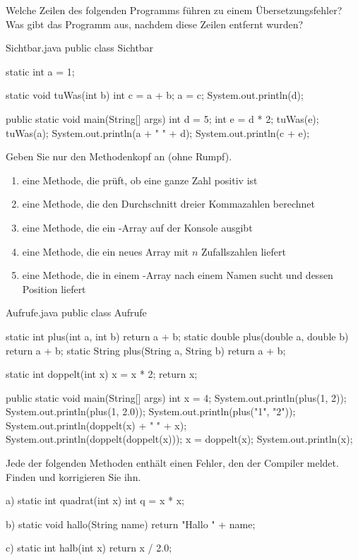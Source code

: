 Welche Zeilen des folgenden Programms führen zu einem Übersetzungsfehler? Was gibt das Programm aus, nachdem diese Zeilen entfernt wurden?
\begin{javacode}{Sichtbar.java}
public class Sichtbar {
	static int a = 1;

	static void tuWas(int b) {
		int c = a + b;
		a = c;
		System.out.println(d);
	}

	public static void main(String[] args) {
		int d = 5;
		{
			int e = d * 2;
			tuWas(e);
		}
		tuWas(a);
		System.out.println(a + " " + d);
		System.out.println(c + e);
	}
}
\end{javacode}

\ueben
{}
Geben Sie nur den Methodenkopf an (ohne Rumpf).
\begin{enumerate}[label=\alph*)]
\item eine Methode, die prüft, ob eine ganze Zahl positiv ist
\item eine Methode, die den Durchschnitt dreier Kommazahlen berechnet
\item eine Methode, die ein -Array auf der Konsole ausgibt
\item eine Methode, die ein neues Array mit $n$ Zufallszahlen liefert
\item eine Methode, die in einem -Array nach einem Namen sucht und dessen Position liefert
\end{enumerate}

\begin{javacode}{Aufrufe.java}
public class Aufrufe {
	static int plus(int a, int b) { return a + b; }
	static double plus(double a, double b) { return a + b; }
	static String plus(String a, String b) { return a + b; }

	static int doppelt(int x) {
		x = x * 2;
		return x;
	}

	public static void main(String[] args) {
		int x = 4;
		System.out.println(plus(1, 2));
		System.out.println(plus(1, 2.0));
		System.out.println(plus("1", "2"));
		System.out.println(doppelt(x) + " " + x);
		System.out.println(doppelt(doppelt(x)));
		x = doppelt(x);
		System.out.println(x);
	}
}
\end{javacode}

Jede der folgenden Methoden enthält einen Fehler, den der Compiler meldet. Finden und korrigieren Sie ihn.
\begin{tcbraster}[raster columns=3, raster equal height=rows, raster column skip=3mm]
\begin{javacode}[Ausschnitt]{a)}
static int quadrat(int x) {
	int q = x * x;
}
\end{javacode}
\begin{javacode}[Ausschnitt]{b)}
static void hallo(String name) {
	return "Hallo " + name;
}
\end{javacode}
\begin{javacode}[Ausschnitt]{c)}
static int halb(int x) {
	return x / 2.0;
}
\end{javacode}
\end{tcbraster}

